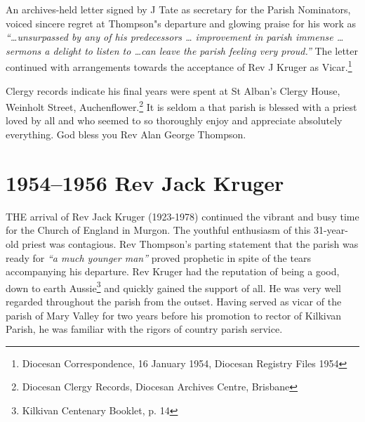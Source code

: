 An archives-held letter signed by J Tate as secretary for the Parish Nominators, voiced sincere regret at Thompson"s departure and glowing praise for his work as \emph{``\ldots unsurpassed by any of his predecessors \ldots{} improvement in parish immense \ldots{} sermons a delight to listen to \ldots can leave the parish feeling very proud.''} The letter continued with arrangements towards the acceptance of Rev J Kruger as Vicar.\footnote{Diocesan Correspondence, 16 January 1954, Diocesan Registry Files 1954}


Clergy records indicate his final years were spent at St Alban's Clergy House, Weinholt Street, Auchenflower.\footnote{Diocesan Clergy Records, Diocesan Archives Centre, Brisbane} It is seldom a that parish is blessed with a priest loved by all and who seemed to so thoroughly enjoy and appreciate absolutely everything. God bless you Rev Alan George Thompson.


\printendnotes[custom]
\setcounter{endnote}{0}




\chapter{1954--1956 Rev Jack Kruger}
\nobalance


\lettrine[lines=3]{T}{HE}
 arrival of Rev Jack Kruger (1923-1978) continued the vibrant and busy time for the Church of England in Murgon. The youthful enthusiasm of this 31-year-old priest was contagious. Rev Thompson's parting statement that the parish was ready for \emph{``a much younger man''} proved prophetic in spite of the tears accompanying his departure. Rev Kruger had the reputation of being a good, down to earth Aussie\footnote{Kilkivan Centenary Booklet, p. 14} and quickly gained the support of all. He was very well regarded throughout the parish from the outset. Having served as vicar of the parish of Mary Valley for two years before his promotion to rector of Kilkivan Parish, he was familiar with the rigors of country parish service.

